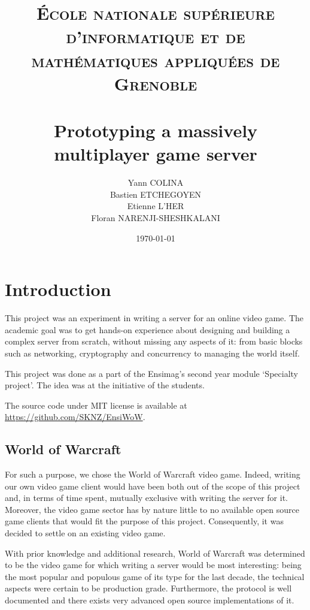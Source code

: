 \documentclass[paper=a4, fontsize=11pt]{scrartcl}
\title{%
    \normalfont{}
    \normalsize{}
    \textsc{École nationale supérieure d'informatique et de mathématiques appliquées de Grenoble} \\ [10pt]
    \horrule{0.5pt} \\[0.4cm]
    \huge Prototyping a massively multiplayer game server
    \horrule{2pt} \\[0.5cm]
}
\author{Yann COLINA\\
Bastien ETCHEGOYEN\\
Etienne L'HER\\
Floran NARENJI-SHESHKALANI}
\date{\normalsize\today}
\begin{document}
\maketitle

\iffalse{}
* Reflection
* Actor system/hierarchy
* API
* Diagrams
    * Actors hierarchy/messages
    * Client protocol
* Protocol (scodec)
* Handlers
* AuthServer
    * SRP6a
* WorldServer
    * RC4a
    * Actor interactions (EventStream)
* Reverse engineering difficulties
    * Big protocol, organicly built, too many features
* Sources
    * TrinityCore
    * Akka docs
    * Scala docs
    * scodec
* Scala
    * Functional
    * Immutable
    * Preferred language for Akka actors (ugly in Java)
    * Strongly typed
    * Full of syntaxic sugar
    * Ahead of it's time ('research language')
    * Home grown language (der Schweiz)

\fi

\section{Introduction}

This project was an experiment in writing a server for an online
video game.
The academic goal was to get hands-on experience about designing and building a
complex server from scratch, without missing any aspects of it: from basic blocks
such as networking, cryptography and concurrency to managing the world itself.

This project was done as a part of the Ensimag's second year module `Specialty
project'.
The idea was at the initiative of the students.

The source code under MIT license is available at
\url{https://github.com/SKNZ/EnsiWoW}.

\subsection{World of Warcraft}

For such a purpose, we chose the World of Warcraft video game.
Indeed, writing our own video game client would have been both out of the scope
of this project and, in terms of time spent, mutually exclusive with writing the
server for it.
Moreover, the video game sector has by nature little to no available open source
game clients that would fit the purpose of this project.
Consequently, it was decided to settle on an existing video game.

With prior knowledge and additional research, World of Warcraft was determined
to be the video game for which writing a server would be most interesting: being
the most popular and populous game of its type for the last decade, the
technical aspects were certain to be production grade.
Furthermore, the protocol is well documented and there exists very advanced open
source implementations of it.
\end{document}
